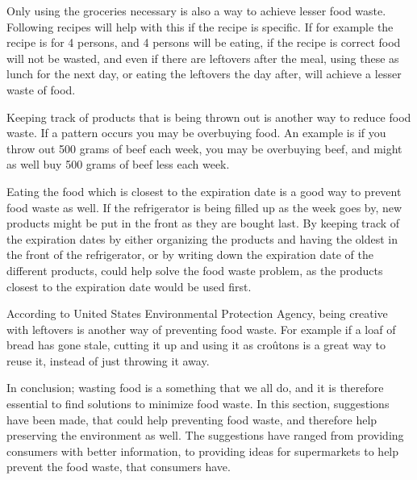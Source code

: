 Only using the groceries necessary is also a way to achieve lesser food waste. Following recipes will help with this if the recipe is specific. If for example the recipe is for 4 persons, and 4 persons will be eating, if the recipe is correct food will not be wasted, and even if there are leftovers after the meal, using these as lunch for the next day, or eating the leftovers the day after, will achieve a lesser waste of food\cite{madSpild_MindreMadspild}.

Keeping track of products that is being thrown out is another way to reduce food waste. If a pattern occurs you may be overbuying food. An example is if you throw out 500 grams of beef each week, you may be overbuying beef, and might as well buy 500 grams of beef less each week\cite{madSpild_Greatist}.

Eating the food which is closest to the expiration date is a good way to prevent food waste as well. If the refrigerator is being filled up as the week goes by, new products might be put in the front as they are bought last. By keeping track of the expiration dates by either organizing the products and having the oldest in the front of the refrigerator, or by writing down the expiration date of the different products, could help solve the food waste problem, as the products closest to the expiration date would be used first. 

According to United States Environmental Protection Agency\cite{madSpild_EPA}, being creative with leftovers is another way of preventing food waste. For example if a loaf of bread has gone stale, cutting it up and using it as croûtons is a great way to reuse it, instead of just throwing it away.

In conclusion; wasting food is a something that we all do, and it is therefore essential to find solutions to minimize food waste. In this section, suggestions have been made, that could help preventing food waste, and therefore help preserving the environment as well. The suggestions have ranged from providing consumers with better information, to providing ideas for supermarkets to help prevent the food waste, that consumers have.